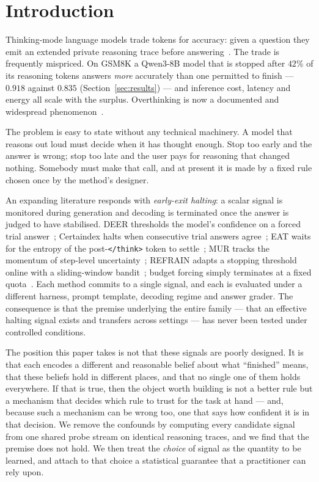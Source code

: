 \documentclass[acmsmall]{acmart}
\theoremstyle{acmdefinition}%
\theoremstyle{acmplain}}{}%
\begin{document}
\section{Introduction}
Thinking-mode language models trade tokens for accuracy: given a question they emit an extended private reasoning trace before answering~\cite{wei2022chain,deepseekai2025r1,yang2025qwen3}. The trade is frequently mispriced. On GSM8K a Qwen3-8B model that is stopped after $42\%$ of its reasoning tokens answers \emph{more} accurately than one permitted to finish --- $0.918$ against $0.835$ (Section~\ref{sec:results}) --- and inference cost, latency and energy all scale with the surplus. Overthinking is now a documented and widespread phenomenon~\cite{chen2024overthinking,sui2025stop,qu2025survey}.

The problem is easy to state without any technical machinery. A model that reasons out loud must decide when it has thought enough. Stop too early and the answer is wrong; stop too late and the user pays for reasoning that changed nothing. Somebody must make that call, and at present it is made by a fixed rule chosen once by the method's designer.

An expanding literature responds with \emph{early-exit halting}: a scalar signal is monitored during generation and decoding is terminated once the answer is judged to have stabilised. DEER thresholds the model's confidence on a forced trial answer~\cite{yang2025deer}; Certaindex halts when consecutive trial answers agree~\cite{fu2024certaindex}; EAT waits for the entropy of the post-\texttt{</think>} token to settle~\cite{wang2025eat}; MUR tracks the momentum of step-level uncertainty~\cite{yan2025mur}; REFRAIN adapts a stopping threshold online with a sliding-window bandit~\cite{sun2025refrain}; budget forcing simply terminates at a fixed quota~\cite{muennighoff2025s1}. Each method commits to a single signal, and each is evaluated under a different harness, prompt template, decoding regime and answer grader. The consequence is that the premise underlying the entire family --- that an effective halting signal exists and transfers across settings --- has never been tested under controlled conditions.

The position this paper takes is not that these signals are poorly designed. It is that each encodes a different and reasonable belief about what ``finished'' means, that these beliefs hold in different places, and that no single one of them holds everywhere. If that is true, then the object worth building is not a better rule but a mechanism that decides which rule to trust for the task at hand --- and, because such a mechanism can be wrong too, one that says how confident it is in that decision. We remove the confounds by computing every candidate signal from one shared probe stream on identical reasoning traces, and we find that the premise does not hold. We then treat the \emph{choice} of signal as the quantity to be learned, and attach to that choice a statistical guarantee that a practitioner can rely upon.
\end{document}
